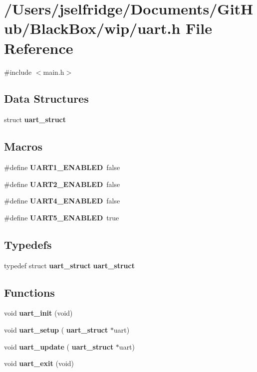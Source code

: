\section{/\+Users/jselfridge/\+Documents/\+Git\+Hub/\+Black\+Box/wip/uart.h File Reference}
\label{uart_8h}
{\ttfamily \#include $<$main.\+h$>$}\newline
\subsection*{Data Structures}
\begin{DoxyCompactItemize}
\item 
struct \textbf{ uart\+\_\+struct}
\end{DoxyCompactItemize}
\subsection*{Macros}
\begin{DoxyCompactItemize}
\item 
\#define \textbf{ U\+A\+R\+T1\+\_\+\+E\+N\+A\+B\+L\+ED}~false
\item 
\#define \textbf{ U\+A\+R\+T2\+\_\+\+E\+N\+A\+B\+L\+ED}~false
\item 
\#define \textbf{ U\+A\+R\+T4\+\_\+\+E\+N\+A\+B\+L\+ED}~false
\item 
\#define \textbf{ U\+A\+R\+T5\+\_\+\+E\+N\+A\+B\+L\+ED}~true
\end{DoxyCompactItemize}
\subsection*{Typedefs}
\begin{DoxyCompactItemize}
\item 
typedef struct \textbf{ uart\+\_\+struct} \textbf{ uart\+\_\+struct}
\end{DoxyCompactItemize}
\subsection*{Functions}
\begin{DoxyCompactItemize}
\item 
void \textbf{ uart\+\_\+init} (void)
\item 
void \textbf{ uart\+\_\+setup} (\textbf{ uart\+\_\+struct} $\ast$uart)
\item 
void \textbf{ uart\+\_\+update} (\textbf{ uart\+\_\+struct} $\ast$uart)
\item 
void \textbf{ uart\+\_\+exit} (void)
\end{DoxyCompactItemize}
